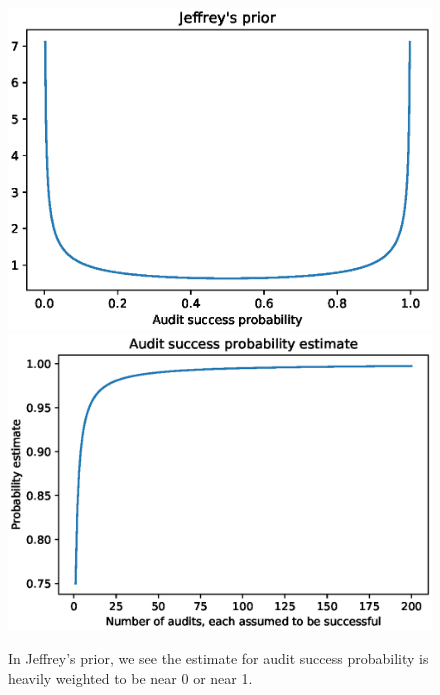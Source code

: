 \begin{figure}[!htbp]
    \centering
    \includegraphics[height=.22\textheight]{audit-success/jeffrey_prior.eps}
    \includegraphics[height=.22\textheight]{audit-success/jeffrey_estimate.eps}
\caption{In Jeffrey's prior, we see the estimate for audit success probability is heavily weighted to be near 0 or near 1.}
\label{fig:jeff_prior}
\end{figure}

